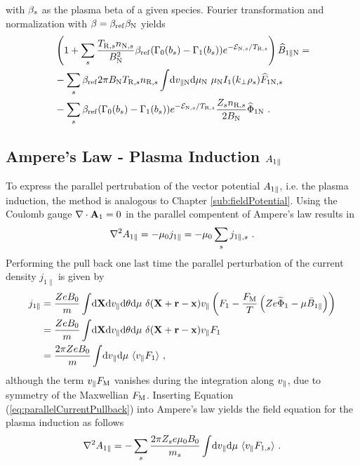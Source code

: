 with $\beta_s$ as the plasma beta of a given species. Fourier transformation and normalization with $\beta = \beta_\mathrm{ref} \beta_\mathrm{N}$ yields
\begin{gather}
    \begin{aligned}
        &\left(1 + \sum_s \frac{T_{\mathrm{R},s}n_{\mathrm{N},s}}{B_\mathrm{N}^2} \beta_\mathrm{ref} (\Gamma_0(b_s) - \Gamma_1(b_s)) e^{-\mathcal{E}_{\mathrm{N},s}/T_{\mathrm{R},s}}\right) \widehat{B}_{1\parallel \mathrm{N}} = \\
        &-\sum_s \beta_\mathrm{ref} 2\pi B_\mathrm{N} T_{\mathrm{R},s} n_{\mathrm{R},s} \int \! \mathrm{d}v_{\parallel \mathrm{N}} \mathrm{d}\mu_\mathrm{N} ~ \mu_\mathrm{N} I_1(k_\perp \rho_s) \widehat{F}_{1\mathrm{N},s} \\
        &-\sum_s \beta_\mathrm{ref} (\Gamma_0(b_s) - \Gamma_1(b_s)) e^{-\mathcal{E}_{\mathrm{N},s}/T_{\mathrm{R},s}} \frac{Z_sn_{\mathrm{R},s}}{2 B_\mathrm{N}} \widehat{\Phi}_{1 \mathrm{N}} ~.
    \end{aligned}
\end{gather}
\newpage

\subsection{Ampere's Law - Plasma Induction $A_{1\parallel}$}
\label{sub:fieldInduction}

To express the parallel pertrubation of the vector potential $A_{1\parallel}$, i.e. the plasma induction, the method is analogous to Chapter \ref{sub:fieldPotential}. Using the Coulomb gauge $\nabla \cdot \boldsymbol{\mathbf{A}}_1 = 0$ in the parallel compentent of Ampere's law results in
\begin{gather}
	\nabla^2 A_{1\parallel} = - \mu_0 j_{1\parallel} = - \mu_0 \sum_s j_{1\parallel,s}~.
	\label{eq:parallelAmpereLaw}
\end{gather}
Performing the pull back one last time the parallel perturbation of the current density $j_{1\parallel}$ is given by
\begin{gather}
	\begin{aligned}
		j_{1\parallel} &= \frac{Ze B_0}{m} \int \! \mathrm{d}\boldsymbol{\mathbf{X}}\mathrm{d}v_\parallel\mathrm{d}\theta\mathrm{d}\mu ~ \delta(\boldsymbol{\mathbf{X}} + \boldsymbol{\mathbf{r}} - \boldsymbol{\mathbf{x}}) v_\parallel \left(F_1 - \frac{F_\mathrm{M}}{T}\left(Ze \widetilde{\Phi}_1 - \mu \bar{B}_{1\parallel}\right) \right)\\
					   &= \frac{Ze B_0}{m} \int \! \mathrm{d}\boldsymbol{\mathbf{X}}\mathrm{d}v_\parallel\mathrm{d}\theta\mathrm{d}\mu ~ \delta(\boldsymbol{\mathbf{X}} + \boldsymbol{\mathbf{r}} - \boldsymbol{\mathbf{x}}) v_\parallel F_1 \\
					   &= \frac{2\pi Ze B_0}{m} \int \! \mathrm{d}v_\parallel\mathrm{d}\mu ~ \langle v_\parallel F_1\rangle~,
	\end{aligned}
	\label{eq:parallelCurrentPullback}
\end{gather}
although the term $v_\parallel F_\mathrm{M}$ vanishes during the integration along $v_\parallel$, due to symmetry of the Maxwellian $F_\mathrm{M}$. 
Inserting Equation (\ref{eq:parallelCurrentPullback}) into Ampere's law yields the field equation for the plasma induction as follows
\begin{gather}
	\nabla^2 A_{1\parallel} = - \sum_s \frac{2\pi Z_se \mu_0 B_0}{m_s}  \int \! \mathrm{d}v_\parallel\mathrm{d}\mu ~ \langle v_\parallel F_{1,s}\rangle~.
	\label{eq:fieldInduction}
\end{gather}

